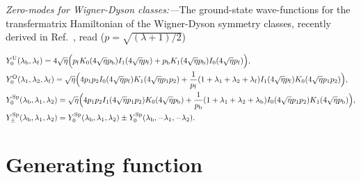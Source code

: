 \documentclass[twocolumn,showpacs,aps,prl]{revtex4}
\begin{document}
{\it Zero-modes for Wigner-Dyson classes:---}The ground-state 
wave-functions  for the transfermatrix Hamiltonian 
of the Wigner-Dyson symmetry classes,  
recently derived in Ref.~, 
read ($p=\sqrt{(\lambda+1)/2}$) 
\begin{widetext}
\begin{align}
&Y^{\rm U}_0(\lambda_{\rm b},\lambda_{\rm f})
=
4\sqrt{\eta}
\Big(
p_{\rm f} 
K_0(4\sqrt{\eta} p_{\rm b})I_1(4\sqrt{\eta}p_{\rm f})
 + 
p_{\rm b}
K_1(4\sqrt{\eta}p_{\rm b})I_0(4\sqrt{\eta}p_{\rm f})
\Big),
\\
&Y^{\rm O}_0(\lambda_1,\lambda_2,\lambda_{\rm f})
=
\sqrt{\eta}
\Big(
4p_1p_2
I_0(4\sqrt{\eta}p_{\rm f}) K_1(4\sqrt{\eta}p_1p_2)
+
{1\over p_{\rm f}}
( 1 + \lambda_1 +\lambda_2 +\lambda_{\rm f} )
I_1(4\sqrt{\eta}p_{\rm f}) K_0(4\sqrt{\eta}p_1p_2)
\Big),
\\
&Y^{\rm Sp}_0(\lambda_{\rm b},\lambda_1,\lambda_2)
=
\sqrt{\eta}
\Big(
4p_1p_2
I_1(4\sqrt{\eta}p_1p_2) K_0(4\sqrt{\eta}p_{\rm b})
+
{1\over p_{\rm b}}
( 1 + \lambda_1 +\lambda_2 +\lambda_{\rm b} )
I_0(4\sqrt{\eta}p_1p_2) K_1(4\sqrt{\eta}p_{\rm b})
\Big),
\\
&Y^{\rm Sp}_\pm(\lambda_{\rm b},\lambda_1,\lambda_2)
=
Y^{\rm Sp}_0(\lambda_{\rm b},\lambda_1,\lambda_2)
\pm 
Y^{\rm Sp}_0(\lambda_{\rm b},-\lambda_1,-\lambda_2).
\end{align} 
\end{widetext}




\section{Generating function}
\end{document}
